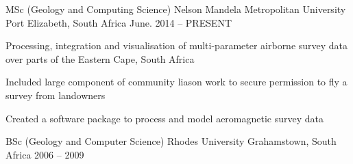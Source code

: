 


\begin{cventries}


\cventry
{MSc (Geology and Computing Science)} %
{Nelson Mandela Metropolitan University} %
{Port Elizabeth, South Africa} %
{June. 2014 -- PRESENT} %
{ %
\begin{cvitems}
\item {Processing, integration and visualisation of multi-parameter airborne survey data over parts of the Eastern Cape, South Africa}
\item {Included large component of community liason work to secure permission to fly a survey from landowners}
\item {Created a software package to process and model aeromagnetic survey data}
\end{cvitems}
}

\cventry
{BSc (Geology and Computer Science)}
{Rhodes University}
{Grahamstown, South Africa}
{2006 -- 2009}
{}



\end{cventries}